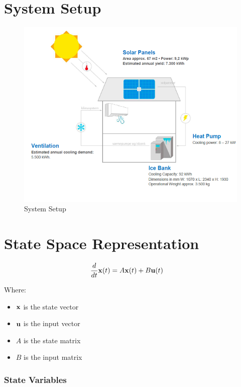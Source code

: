 
\section{System Setup}

\begin{figure}[h]
  \centering
  \includegraphics[scale=0.7]{figures/systemSetup}
  \caption{System Setup}
  \label{fig:systemSetup}
\end{figure}

\newpage
\section{State Space Representation}

\begin{align*}
  \frac{d}{dt}\mathbf{x}(t) &= A\mathbf{x}(t) + B\mathbf{u}(t)
\end{align*}

Where:
\begin{itemize}
\item $\mathbf{x}$ is the state vector
\item $\mathbf{u}$ is the input vector
\item $A$ is the state matrix
\item $B$ is the input matrix
\end{itemize}



\subsubsection{State Variables}

